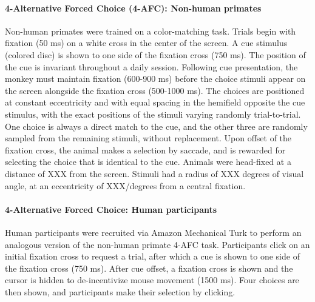 \paragraph{4-Alternative Forced Choice (4-AFC): Non-human primates} \label{para:4AFC}
Non-human primates were trained on a color-matching task. 
Trials begin with fixation (50 ms) on a white cross in the center of the screen. 
A cue stimulus (colored disc) is shown to one side of the fixation cross (750 ms). 
The position of the cue is invariant throughout a daily session. 
Following cue presentation, the monkey must maintain fixation (600-900 ms) before the choice stimuli appear on the screen alongside the fixation cross (500-1000 ms). 
The choices are positioned at constant eccentricity and with equal spacing in the hemifield opposite the cue stimulus, with the exact positions of the stimuli varying randomly trial-to-trial. 
One choice is always a direct match to the cue, and the other three are randomly sampled from the remaining stimuli, without replacement.
Upon offset of the fixation cross, the animal makes a selection by saccade, and is rewarded for selecting the choice that is identical to the cue. 
Animals were head-fixed at a distance of XXX from the screen. 
Stimuli had a radius of XXX degrees of visual angle, at an eccentricity of XXX/degrees from a central fixation.

\paragraph{4-Alternative Forced Choice: Human participants} 
Human participants were recruited via Amazon Mechanical Turk to perform an analogous version of the non-human primate 4-AFC task. 
Participants click on an initial fixation cross to request a trial, after which a cue is shown to one side of the fixation cross (750 ms). 
After cue offset, a fixation cross is shown and the cursor is hidden to de-incentivize mouse movement (1500 ms). 
Four choices are then shown, and participants make their selection by clicking. 








